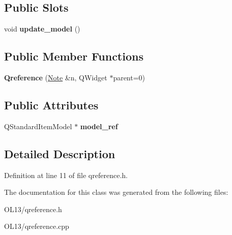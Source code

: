 \subsection*{Public Slots}
\begin{DoxyCompactItemize}
\item 
\mbox{\label{class_qreference_af2792e095c6033fa60f5f0fe273fa6a3}} 
void {\bfseries update\+\_\+model} ()
\end{DoxyCompactItemize}
\subsection*{Public Member Functions}
\begin{DoxyCompactItemize}
\item 
\mbox{\label{class_qreference_ab95224276a2abcdd26376291da58da47}} 
{\bfseries Qreference} (\hyperlink{class_note}{Note} \&n, Q\+Widget $\ast$parent=0)
\end{DoxyCompactItemize}
\subsection*{Public Attributes}
\begin{DoxyCompactItemize}
\item 
\mbox{\label{class_qreference_aba2c9456cb52bed2104c88d0bc727ac1}} 
Q\+Standard\+Item\+Model $\ast$ {\bfseries model\+\_\+ref}
\end{DoxyCompactItemize}


\subsection{Detailed Description}


Definition at line 11 of file qreference.\+h.



The documentation for this class was generated from the following files\+:\begin{DoxyCompactItemize}
\item 
O\+L13/qreference.\+h\item 
O\+L13/qreference.\+cpp\end{DoxyCompactItemize}
